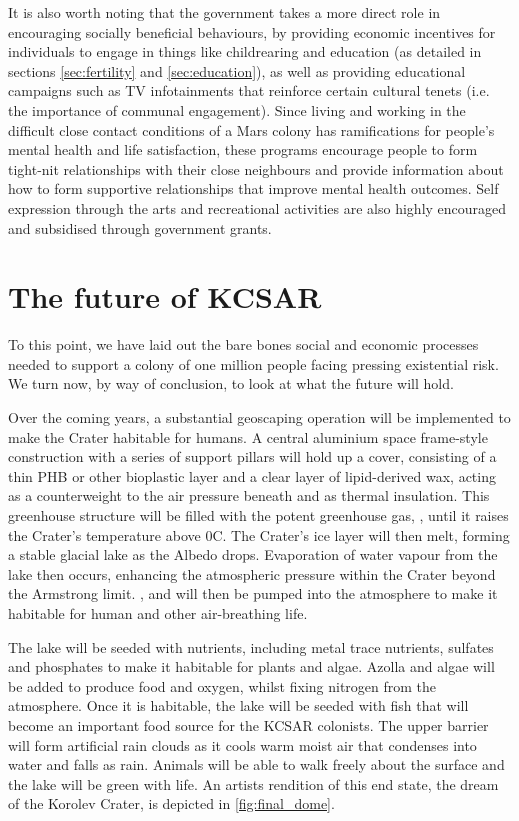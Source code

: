 \documentclass[fleqn,10pt]{Stylesheet} %
\begin{document}
It is also worth noting that the government takes a more direct role in encouraging socially beneficial behaviours, by providing economic incentives for individuals to engage in things like childrearing and education (as detailed in sections \ref{sec:fertility} and \ref{sec:education}), as well as providing educational campaigns such as TV infotainments that reinforce certain cultural tenets (i.e. the importance of communal engagement). Since living and working in the difficult close contact conditions of a Mars colony has ramifications for people's mental health and life satisfaction, these programs encourage people to form tight-nit relationships with their close neighbours and provide information about how to form supportive relationships that improve mental health outcomes. Self expression through the arts and recreational activities are also highly encouraged and subsidised through government grants.

\section{The future of KCSAR}
To this point, we have laid out the bare bones social and economic processes needed to support a colony of one million people facing pressing existential risk. We turn now, by way of conclusion, to look at what the future will hold. 

Over the coming years, a substantial geoscaping operation will be implemented to make the Crater habitable for humans. A central aluminium space frame-style construction with a series of support pillars will hold up a cover, consisting of a thin PHB or other bioplastic layer and a clear layer of lipid-derived wax, acting as a counterweight to the air pressure beneath and as thermal insulation. This greenhouse structure will be filled with the potent greenhouse gas, , until it raises the Crater's temperature above 0\degree{}C. The Crater’s ice layer will then melt, forming a stable glacial lake as the Albedo drops. Evaporation of water vapour from the lake then occurs, enhancing the atmospheric pressure within the Crater beyond the Armstrong limit. ,  and  will then be pumped into the atmosphere to make it habitable for human and other air-breathing life.

The lake will be seeded with nutrients, including metal trace nutrients, sulfates and phosphates to make it habitable for plants and algae. Azolla and algae will be added to produce food and oxygen, whilst fixing nitrogen from the atmosphere. Once it is habitable, the lake will be seeded with fish that will become an important food source for the KCSAR colonists. The upper barrier will form artificial rain clouds as it cools warm moist air that condenses into water and falls as rain. Animals will be able to walk freely about the surface and the lake will be green with life. An artists rendition of this end state, the dream of the Korolev Crater, is depicted in \ref{fig:final_dome}.
\end{document}
